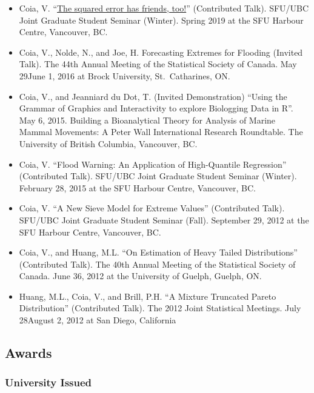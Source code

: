 \documentclass[]{article}
\begin{document}
\begin{itemize}
\item
  Coia, V. ``\href{https://vincenzocoia.com/post/20190316-ubc-sfu/}{The squared error has friends, too!}''
  (Contributed Talk). SFU/UBC Joint Graduate Student Seminar (Winter).
  Spring 2019 at the SFU Harbour Centre, Vancouver, BC.
\item
  Coia, V., Nolde, N., and Joe, H. Forecasting Extremes for Flooding
  (Invited Talk). The 44th Annual Meeting of the Statistical Society
  of Canada. May 29June 1, 2016 at Brock University, St.~Catharines,
  ON.
\item
  Coia, V., and Jeanniard du Dot, T. (Invited Demonstration) ``Using
  the Grammar of Graphics and Interactivity to explore Biologging Data
  in R''. May 6, 2015. Building a Bioanalytical Theory for Analysis of
  Marine Mammal Movements: A Peter Wall International Research
  Roundtable. The University of British Columbia, Vancouver, BC.
\item
  Coia, V. ``Flood Warning: An Application of High-Quantile Regression''
  (Contributed Talk). SFU/UBC Joint Graduate Student Seminar (Winter).
  February 28, 2015 at the SFU Harbour Centre, Vancouver, BC.
\item
  Coia, V. ``A New Sieve Model for Extreme Values'' (Contributed Talk).
  SFU/UBC Joint Graduate Student Seminar (Fall). September 29, 2012 at
  the SFU Harbour Centre, Vancouver, BC.
\item
  Coia, V., and Huang, M.L. ``On Estimation of Heavy Tailed
  Distributions'' (Contributed Talk). The 40th Annual Meeting of the
  Statistical Society of Canada. June 36, 2012 at the University of
  Guelph, Guelph, ON.
\item
  Huang, M.L., Coia, V., and Brill, P.H. ``A Mixture Truncated Pareto
  Distribution'' (Contributed Talk). The 2012 Joint Statistical
  Meetings. July 28August 2, 2012 at San Diego, California
\end{itemize}

\hypertarget{awards}{%
\subsection{Awards}\label{awards}}

\hypertarget{university-issued}{%
\subsubsection{University Issued}\label{university-issued}}
\end{document}
